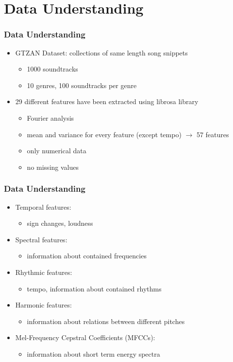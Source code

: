 \documentclass[10pt, aspectratio=169]{beamer}
\begin{document}
\section{Data Understanding}
\begin{frame}
    \frametitle{Data Understanding}
    \begin{itemize}\setlength\itemsep{10pt}
        \item GTZAN Dataset: collections of same length song snippets\begin{itemize}
            \item 1000 soundtracks
            \item 10 genres, 100 soundtracks per genre
        \end{itemize}
        \item 29 different features have been extracted using librosa library\begin{itemize}
            \item Fourier analysis
            \item mean and variance for every feature (except tempo) $\rightarrow$ 57 features
            \item only numerical data
            \item no missing values
        \end{itemize}
    \end{itemize}
\end{frame}

\begin{frame}
    \frametitle{Data Understanding}
    \begin{itemize}\setlength\itemsep{12pt}
        \item Temporal features: \begin{itemize}
            \item sign changes, loudness
        \end{itemize}
        \item Spectral features: \begin{itemize}
            \item information about contained frequencies
        \end{itemize}
        \item Rhythmic features: \begin{itemize}
            \item tempo, information about contained rhythms
        \end{itemize}
        \item Harmonic features: \begin{itemize}
            \item information about relations between different pitches
        \end{itemize}
        \item Mel-Frequency Cepstral Coefficients (MFCCs): \begin{itemize}
            \item information about short term energy spectra
        \end{itemize}
    \end{itemize}
\end{frame}
\end{document}
